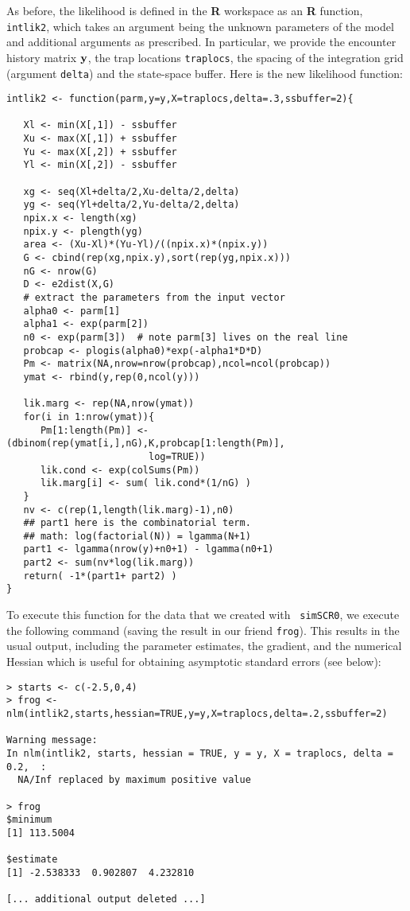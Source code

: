 As before, the likelihood is defined in the {\bf R} workspace as an
{\bf R}
function, \mbox{\tt intlik2}, 
 which takes an argument being the unknown parameters of the
model and additional arguments as prescribed. In particular, 
 we provide the encounter history matrix ${\bf y}$, the trap locations
\mbox{\tt traplocs}, the spacing of the integration grid (argument
\mbox{\tt delta}) and the
state-space buffer. Here is the new likelihood function: 
{\small
\begin{verbatim}
intlik2 <- function(parm,y=y,X=traplocs,delta=.3,ssbuffer=2){

   Xl <- min(X[,1]) - ssbuffer
   Xu <- max(X[,1]) + ssbuffer
   Yu <- max(X[,2]) + ssbuffer
   Yl <- min(X[,2]) - ssbuffer

   xg <- seq(Xl+delta/2,Xu-delta/2,delta) 
   yg <- seq(Yl+delta/2,Yu-delta/2,delta) 
   npix.x <- length(xg)
   npix.y <- plength(yg)
   area <- (Xu-Xl)*(Yu-Yl)/((npix.x)*(npix.y))
   G <- cbind(rep(xg,npix.y),sort(rep(yg,npix.x)))
   nG <- nrow(G)
   D <- e2dist(X,G) 
   # extract the parameters from the input vector
   alpha0 <- parm[1]
   alpha1 <- exp(parm[2])
   n0 <- exp(parm[3])  # note parm[3] lives on the real line
   probcap <- plogis(alpha0)*exp(-alpha1*D*D)
   Pm <- matrix(NA,nrow=nrow(probcap),ncol=ncol(probcap))
   ymat <- rbind(y,rep(0,ncol(y)))

   lik.marg <- rep(NA,nrow(ymat))
   for(i in 1:nrow(ymat)){
      Pm[1:length(Pm)] <- (dbinom(rep(ymat[i,],nG),K,probcap[1:length(Pm)],
                         log=TRUE))
      lik.cond <- exp(colSums(Pm))
      lik.marg[i] <- sum( lik.cond*(1/nG) )  
   }                                                 
   nv <- c(rep(1,length(lik.marg)-1),n0)
   ## part1 here is the combinatorial term. 
   ## math: log(factorial(N)) = lgamma(N+1)
   part1 <- lgamma(nrow(y)+n0+1) - lgamma(n0+1)
   part2 <- sum(nv*log(lik.marg))
   return( -1*(part1+ part2) )
}
\end{verbatim}
} 
To execute this function for the data that we created with \mbox{\tt
  simSCR0}, we execute the following command (saving the result in our
friend \mbox{\tt frog}).  This results in the usual output, including
the parameter estimates, the gradient, and the numerical Hessian which
is useful for obtaining asymptotic standard errors (see below):
\begin{verbatim}
> starts <- c(-2.5,0,4)
> frog <- nlm(intlik2,starts,hessian=TRUE,y=y,X=traplocs,delta=.2,ssbuffer=2)

Warning message:
In nlm(intlik2, starts, hessian = TRUE, y = y, X = traplocs, delta = 0.2,  :
  NA/Inf replaced by maximum positive value

> frog
$minimum
[1] 113.5004

$estimate
[1] -2.538333  0.902807  4.232810

[... additional output deleted ...]
\end{verbatim}
